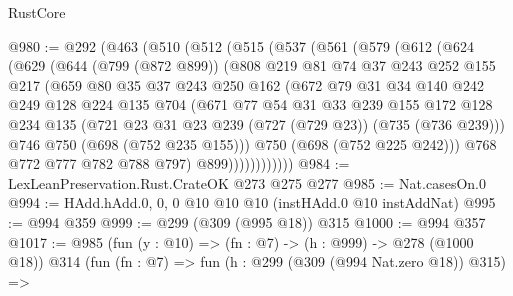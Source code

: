 \begin{lexlean}{RustCore}
\begin{coremodule}
@980 := @292
    (@463
      (@510
        (@512
          (@515
            (@537
              (@561
                (@579
                  (@612
                    (@624
                      (@629
                        (@644
                          (@799 (@872 @899))
                          (@808
                            @219
                            @81
                            @74
                            @37
                            @243
                            @252
                            @155
                            @217
                            (@659
                              @80
                              @35
                              @37
                              @243
                              @250
                              @162
                              (@672
                                @79
                                @31
                                @34
                                @140
                                @242
                                @249
                                @128
                                @224
                                @135
                                @704
                                (@671
                                  @77
                                  @54
                                  @31
                                  @33
                                  @239
                                  @155
                                  @172
                                  @128
                                  @234
                                  @135
                                  (@721 @23 @31 @23 @239 (@727 (@729 @23)) (@735 (@736 @239)))
                                  @746
                                  @750
                                  (@698 (@752 @235 @155)))
                                @750
                                (@698 (@752 @225 @242)))
                              @768
                              @772
                              @777
                              @782
                              @788
                              @797)
                            @899))))))))))))
@984 := LexLeanPreservation.Rust.CrateOK @273 @275 @277
@985 := Nat.casesOn.{0}
@994 := HAdd.hAdd.{0, 0, 0} @10 @10 @10 (instHAdd.{0} @10 instAddNat)
@995 := @994 @359
@999 := @299 (@309 (@995 @18)) @315
@1000 := @994 @357
@1017 := @985
    (fun (y : @10) => (fn : @7) -> (h : @999) -> @278 (@1000 @18))
    @314
    (fun (fn : @7) =>
    fun (h : @299 (@309 (@994 Nat.zero @18)) @315) =>

\end{coremodule}
\end{lexlean}
